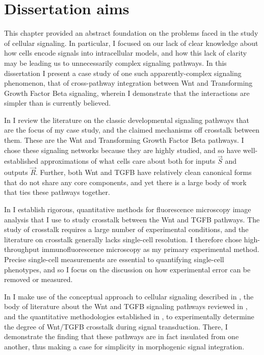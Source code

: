 \section{Dissertation aims}
\label{introduction:aims}

This chapter provided an abstract foundation on the
problems faced in the study of cellular signaling. In particular,
I focused on our lack of clear knowledge about how cells encode signals into
intracellular models, and how this lack of clarity may
be leading us to unnecessarily complex signaling pathways.
In this dissertation I present a case study of one
such apparently-complex signaling phenomenon, that of
cross-pathway integration between Wnt and Transforming
Growth Factor Beta signaling, wherein I demonstrate that the
interactions are simpler than is currently believed.


In  I review the literature on the 
classic developmental signaling
pathways that are the focus of my case study, and the
claimed mechanisms off crosstalk between them.
These are the Wnt and
Transforming Growth Factor Beta pathways. I chose these signaling
networks because they are highly studied, and so have
well-established approximations of what cells care about both for inputs
$\vec{S}$ and outputs $\vec{R}$. Further, both Wnt and TGFB have
relatively clean canonical forms that do not share any core
components, and yet there is a large body of work that
ties these pathways together.


In  I establish rigorous, quantitative methods for fluorescence
microscopy image analysis that I use to study crosstalk
between the Wnt and TGFB pathways. The study of crosstalk requires
a large number of experimental conditions, and the literature on 
crosstalk generally lacks single-cell resolution. I therefore chose high-throughput
immunofluorescence microscopy as my primary experimental method.
Precise single-cell measurements
are essential to quantifying single-cell
phenotypes, and so I focus on the discussion on how experimental
error can be removed or measured.


In  I make use of the conceptual approach to
cellular signaling described in ,
the body of literature about the Wnt and TGFB signaling pathways
reviewed in , and the quantitative methodologies
established in , to experimentally determine
the degree of Wnt/TGFB crosstalk during signal transduction. There, I
demonstrate the finding that these pathways are in fact insulated from
one another, thus making a case for simplicity in morphogenic signal
integration.


